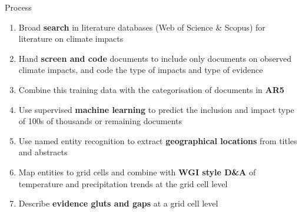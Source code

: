 \documentclass[9pt]{beamer}
\begin{document}
%
%	
%
%
%


\begin{frame}{Process}

\begin{enumerate}
	\item Broad \textbf{search} in literature databases (Web of Science \& Scopus) for literature on climate impacts
	\item Hand \textbf{screen and code} documents to include only documents on observed climate impacts, and code the type of impacts and type of evidence
	\item Combine this training data with the categorisation of documents in \textbf{AR5}
	\item Use supervised \textbf{machine learning} to predict the inclusion and impact type of 100s of thousands or remaining documents
	\item Use named entity recognition to extract \textbf{geographical locations} from titles and abstracts
	\item Map entities to grid cells and combine with \textbf{WGI style D\&A} of temperature and precipitation trends at the grid cell level
	\item Describe \textbf{evidence gluts and gaps} at a grid cell level
	
\end{enumerate}

\end{frame}
\end{document}
